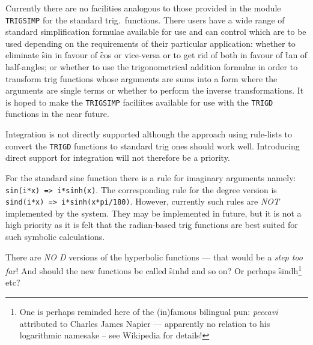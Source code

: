 Currently  there are no facilities analogous to those provided in the module \texttt{TRIGSIMP} for the standard trig.\ functions.  There users have a wide range of  standard simplification formulae available for use and can control which are to be used depending on the  requirements of their particular application: whether to eliminate
 \f{sin} in favour of \f{cos} or vice-versa or to get rid of both in favour of \f{tan} of half-angles; or whether to use the trigonometrical addition formulae in order to transform  trig functions whose arguments are sums into a form where the arguments are single terms or whether to perform the inverse transformations.  It is hoped to make the \texttt{TRIGSIMP}  faciliites available for use with the \texttt{TRIGD} functions in the near future.

Integration is not directly supported although the approach using rule-lists to convert the \texttt{TRIGD} functions  to standard trig ones should work well.  Introducing direct support for integration will not therefore be a priority. 

 For the standard sine function there is a rule for imaginary arguments namely: \texttt{sin(i*x) => i*sinh(x)}. The corresponding rule for the degree version is \texttt{sind(i*x) => i*sinh(x*pi/180)}.  However, currently such rules are \emph{NOT} implemented by the system.  They may be implemented in future, but it is not a high priority as it is felt that the radian-based trig functions are best suited  for such symbolic calculations.

There are \emph{NO D} versions of the hyperbolic functions  --- that would be a \textit{step too far}!  And should the new functions be called \f{sinhd} and so on? Or perhaps \f{sindh}\footnote{One is perhaps reminded here of the (in)famous bilingual pun: \emph{peccavi} attributed to Charles James Napier ---  apparently no relation to his logarithmic namesake -- see Wikipedia for details!} etc?

